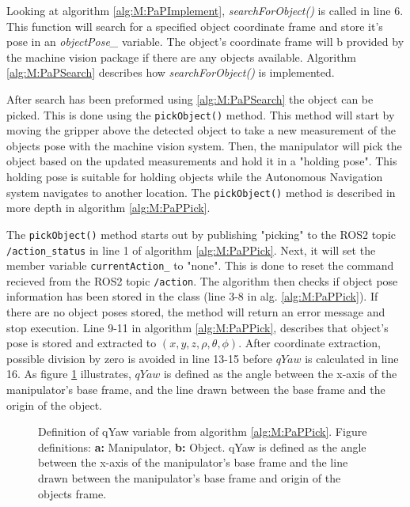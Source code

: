 

Looking at algorithm \ref{alg:M:PaPImplement}, \textit{searchForObject()} is called in line 6. This function will search for a specified object coordinate frame and store it's pose in an \textit{objectPose\_} variable. The object's coordinate frame will b provided by the machine vision package if there are any objects available. Algorithm \ref{alg:M:PaPSearch} describes how \textit{searchForObject()} is implemented.



After search has been preformed using \ref{alg:M:PaPSearch} the object can be picked. This is done using the \lstinline{pickObject()}  method. This method will start by moving the gripper above the detected object to take a new measurement of the objects pose with the machine vision system. Then, the manipulator will pick the object based on the updated measurements and hold it in a "holding pose". This holding pose is suitable for holding objects while the Autonomous Navigation system navigates to another location. The \lstinline{pickObject()}  method is described in more depth in algorithm \ref{alg:M:PaPPick}. 



The \lstinline{pickObject()} method starts out by publishing "picking" to the ROS2 topic \lstinline{/action_status} in line 1 of algorithm \ref{alg:M:PaPPick}. Next, it will set the member variable \lstinline{currentAction_} to "none". This is done to reset the command recieved from the ROS2 topic \lstinline{/action}. The algorithm then checks if object pose information has been stored in the class (line 3-8 in alg. \ref{alg:M:PaPPick}). If there are no object poses stored, the method will return an error message and stop execution. Line 9-11 in algorithm \ref{alg:M:PaPPick}, describes that object's pose is stored and extracted to $(x,y,z,\rho,\theta,\phi)$. After coordinate extraction, possible division by zero is avoided in line 13-15 before $qYaw$ is calculated in line 16. As figure \ref{fig:M:PAP:M:qYaw} illustrates, $qYaw$ is defined as the angle between the x-axis of the manipulator's base frame, and the line drawn between the base frame and the origin of the object.

\begin{figure}[htp]
  \fontsize{14}{14}\selectfont
  \centering
  
  \caption{Definition of qYaw variable from algorithm \ref{alg:M:PaPPick}. Figure definitions: \textbf{a:} Manipulator, \textbf{b:} Object. qYaw is defined as the angle between the x-axis of the manipulator's base frame and the line drawn between the manipulator's base frame and origin of the objects frame.}
  \label{fig:M:PAP:M:qYaw}
\end{figure}

